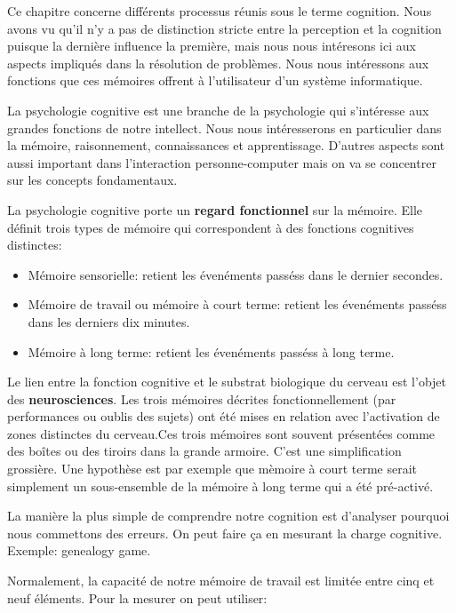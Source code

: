 Ce chapitre concerne diff\'erents processus r\'eunis sous le terme cognition. Nous avons vu qu'il n'y a pas de distinction stricte entre la perception et la cognition puisque la derni\`ere influence la premi\`ere, mais nous nous int\'eresons ici aux aspects impliqu\'es dans la r\'esolution de probl\`emes. Nous nous int\'eressons aux fonctions que ces m\'emoires offrent \`a l'utilisateur d'un syst\`eme informatique.

La psychologie cognitive est une branche de la psychologie qui s'int\'eresse aux grandes fonctions de notre intellect. Nous nous int\'eresserons en particulier dans la m\'emoire, raisonnement, connaissances et apprentissage. D'autres aspects sont aussi important dans l'interaction personne-computer mais on va se concentrer sur les concepts fondamentaux. 

La psychologie cognitive porte un \textbf{regard fonctionnel} sur la m\'emoire. Elle d\'efinit trois types de m\'emoire qui correspondent \`a des fonctions cognitives distinctes:

\begin{itemize}
\item M\'emoire sensorielle: retient les \'even\'ements pass\'ess dans le dernier secondes.
\item M\'emoire de travail ou m\'emoire \`a court terme: retient les \'even\'ements pass\'ess dans les derniers dix minutes.
\item M\'emoire \`a long terme: retient les \'even\'ements pass\'ess \`a long terme. 
\end{itemize}

Le lien entre la fonction cognitive et le substrat biologique du cerveau est l'objet des \textbf{neurosciences}. Les trois m\'emoires d\'ecrites fonctionnellement (par performances ou oublis des sujets) ont \'et\'e mises en relation avec l'activation de zones distinctes du cerveau.Ces trois m\'emoires sont souvent pr\'esent\'ees comme des bo\^ites ou des tiroirs dans la grande armoire. C'est une simplification grossi\`ere. Une hypoth\`ese est par exemple que m\`emoire \`a court terme serait simplement un sous-ensemble de la m\'emoire \`a long terme qui a \'et\'e pr\'e-activ\'e. 

La mani\`ere la plus simple de comprendre notre cognition est d'analyser pourquoi nous commettons des erreurs.  On peut faire \c{c}a en mesurant la charge cognitive. Exemple: genealogy game. 

Normalement, la capacit\'e de notre m\'emoire de travail est limit\'ee entre cinq et neuf \'el\'ements. Pour la mesurer on peut utiliser:

